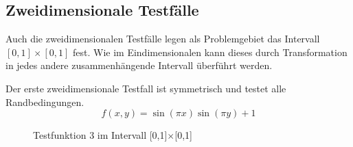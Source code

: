 \clearpage
\subsection{Zweidimensionale Testfälle}

Auch die zweidimensionalen Testfälle legen als Problemgebiet das Intervall
$[0,1]\times[0,1]$ fest. Wie im Eindimensionalen kann dieses durch Transformation
in jedes andere zusammenhängende Intervall überführt werden.

Der erste zweidimensionale Testfall ist symmetrisch und testet alle
Randbedingungen.
\begin{equation}
f(x,y) = \sin(\pi x) \sin(\pi y) + 1
\end{equation}

\begin{figure}[h]
\centering
\begin{subfigure}[b]{.5\linewidth}
\centering
{}
\end{subfigure}%
\begin{subfigure}[b]{.5\linewidth}
\centering
{}
\end{subfigure}
\caption{Testfunktion 3 im Intervall [0,1]$\times$[0,1]}\label{fig:tf3}
\end{figure}

